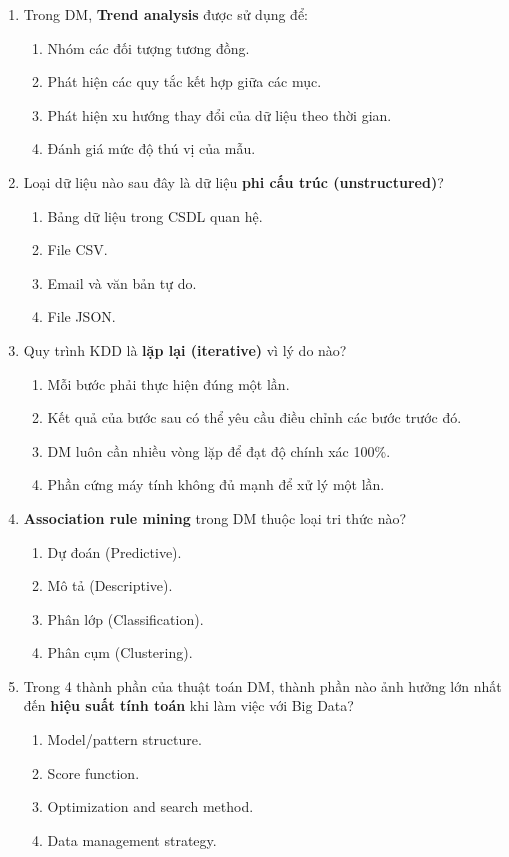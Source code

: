 \documentclass[10pt]{article}
\begin{document}
\begin{enumerate}[leftmargin=*, label=\textbf{Câu \arabic*.}]
    \item Trong DM, \textbf{Trend analysis} được sử dụng để:
    \begin{enumerate}[label=\Alph*.]
        \item Nhóm các đối tượng tương đồng.
        \item Phát hiện các quy tắc kết hợp giữa các mục.
        \item Phát hiện xu hướng thay đổi của dữ liệu theo thời gian.
        \item Đánh giá mức độ thú vị của mẫu.
    \end{enumerate}

    \item Loại dữ liệu nào sau đây là dữ liệu \textbf{phi cấu trúc (unstructured)}?
    \begin{enumerate}[label=\Alph*.]
        \item Bảng dữ liệu trong CSDL quan hệ.
        \item File CSV.
        \item Email và văn bản tự do.
        \item File JSON.
    \end{enumerate}

    \item Quy trình KDD là \textbf{lặp lại (iterative)} vì lý do nào?
    \begin{enumerate}[label=\Alph*.]
        \item Mỗi bước phải thực hiện đúng một lần.
        \item Kết quả của bước sau có thể yêu cầu điều chỉnh các bước trước đó.
        \item DM luôn cần nhiều vòng lặp để đạt độ chính xác 100\%.
        \item Phần cứng máy tính không đủ mạnh để xử lý một lần.
    \end{enumerate}

    \item \textbf{Association rule mining} trong DM thuộc loại tri thức nào?
    \begin{enumerate}[label=\Alph*.]
        \item Dự đoán (Predictive).
        \item Mô tả (Descriptive).
        \item Phân lớp (Classification).
        \item Phân cụm (Clustering).
    \end{enumerate}

    \item Trong 4 thành phần của thuật toán DM, thành phần nào ảnh hưởng lớn nhất đến \textbf{hiệu suất tính toán} khi làm việc với Big Data?
    \begin{enumerate}[label=\Alph*.]
        \item Model/pattern structure.
        \item Score function.
        \item Optimization and search method.
        \item Data management strategy.
    \end{enumerate}


\end{enumerate}
\end{document}
